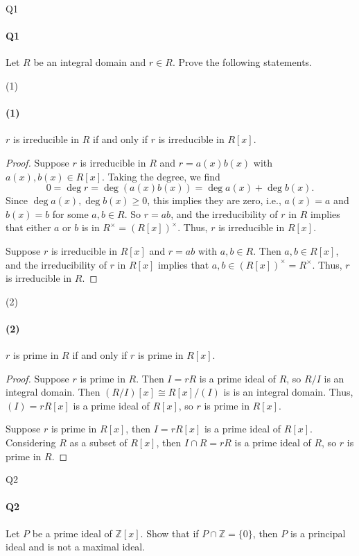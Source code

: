 \documentclass[12pt]{article}
\newenvironment{fullbox}{\begin{lrbox}{\savefullbox}\begin{minipage}{\dimexpr\textwidth-2\fboxsep\relax}}{\end{minipage}\end{lrbox}\begin{center}\framebox[\textwidth]{\usebox{\savefullbox}}\end{center}}
\newenvironment{pbox}[1][]{\begin{fullbox}\ifx#1\empty\else\paragraph{#1}\fi}{\end{fullbox}}
\theoremstyle{definition}
\newcommand{\Z}{\mathbb{Z}}
\newcommand{\isom}{\cong}
\begin{document}
\thispagestyle{title}


\begin{pbox}[Q1]
    Let $R$ be an integral domain and $r \in R$. Prove the following statements.
\end{pbox}

\begin{pbox}[(1)]
    $r$ is irreducible in $R$ if and only if $r$ is irreducible in $R[x]$.
\end{pbox}

\begin{proof}
    Suppose $r$ is irreducible in $R$ and $r = a(x)b(x)$ with $a(x), b(x) \in R[x]$. Taking the degree, we find
    \[
        0
            =\deg r
            = \deg(a(x)b(x))
            = \deg a(x) + \deg b(x).
    \]
    Since $\deg a(x), \deg b(x) \geq 0$, this implies they are zero, i.e., $a(x) = a$ and $b(x) = b$ for some $a, b \in R$. So $r = ab$, and the irreducibility of $r$ in $R$ implies that either $a$ or $b$ is in $R^\times = (R[x])^\times$. Thus, $r$ is irreducible in $R[x]$.
    
    Suppose $r$ is irreducible in $R[x]$ and $r = ab$ with $a, b \in R$. Then $a, b \in R[x]$, and the irreducibility of $r$ in $R[x]$ implies that $a, b \in (R[x])^\times = R^\times$. Thus, $r$ is irreducible in $R$.
    
\end{proof}

\begin{pbox}[(2)]
    $r$ is prime in $R$ if and only if $r$ is prime in $R[x]$.
\end{pbox}

\begin{proof}
    Suppose $r$ is prime in $R$. Then $I = rR$ is a prime ideal of $R$, so $R/I$ is an integral domain. Then $(R/I)[x] \isom R[x]/(I)$ is is an integral domain. Thus, $(I) = rR[x]$ is a prime ideal of $R[x]$, so $r$ is prime in $R[x]$.
    
    Suppose $r$ is prime in $R[x]$, then $I = rR[x]$ is a prime ideal of $R[x]$. Considering $R$ as a subset of $R[x]$, then $I \cap R = rR$ is a prime ideal of $R$, so $r$ is prime in $R$.
    
\end{proof}

\begin{pbox}[Q2]
    Let $P$ be a prime ideal of $\Z[x]$. Show that if $P \cap \Z = \{0\}$, then $P$ is a principal ideal and is not a maximal ideal. 
\end{pbox}
\end{document}
